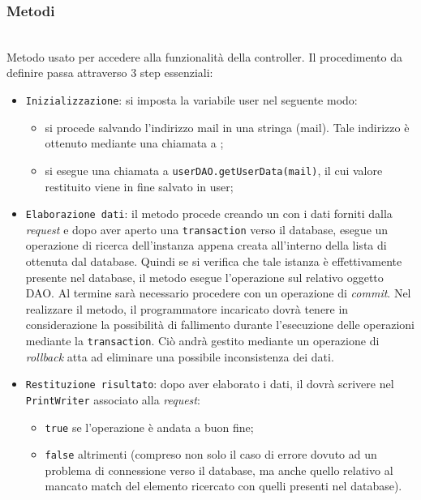 \subsubsection*{Metodi}
\begin{description}

\item{}\\
	Metodo usato per accedere alla funzionalità della controller. Il procedimento da definire passa attraverso 3 step essenziali:
	\begin{itemize}
		\item \texttt{Inizializzazione}: si imposta la variabile user nel seguente modo:
			\begin{itemize}
				\item si procede salvando l'indirizzo mail in una stringa (mail). Tale indirizzo è ottenuto mediante una chiamata a ;
				\item si esegue una chiamata a \texttt{userDAO.getUserData(mail)}, il cui valore restituito viene in fine salvato in user;
			\end{itemize}
		\item \texttt{Elaborazione dati}: il metodo procede creando un  con i dati forniti dalla \textit{request} e dopo aver aperto una \texttt{transaction} verso il database, esegue un operazione di ricerca dell'instanza appena creata all'interno della lista di  ottenuta dal database. Quindi se si verifica che tale istanza è effettivamente presente nel database, il metodo esegue l'operazione  sul relativo oggetto DAO. Al termine sarà necessario procedere con un operazione di \textit{commit}. Nel realizzare il metodo, il programmatore incaricato dovrà tenere in considerazione la possibilità di fallimento durante l'esecuzione delle operazioni mediante la \texttt{transaction}. Ciò andrà gestito mediante un operazione di \textit{rollback} atta ad eliminare una possibile inconsistenza dei dati.
		\item \texttt{Restituzione risultato}: dopo aver elaborato i dati, il  dovrà scrivere nel \texttt{PrintWriter} associato alla \textit{request}:
			\begin{itemize}
				\item \texttt{true} se l'operazione è andata a buon fine;
				\item \texttt{false} altrimenti (compreso non solo il caso di errore dovuto ad un problema di connessione verso il database, ma anche quello relativo al mancato match del elemento ricercato con quelli presenti nel database).
			\end{itemize}
	\end{itemize}

\end{description}

